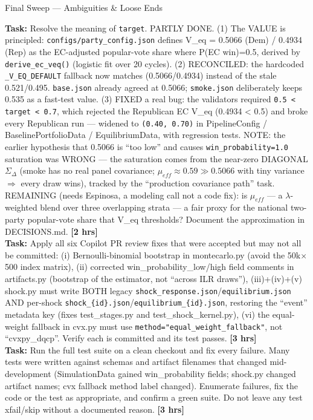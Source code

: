 \documentclass[11pt]{article}
\newcommand{\hrs}[1]{\textbf{[#1 hrs]}}
\newcommand{\task}[2]{%
  \noindent\textbf{Task:} #1 \hfill \hrs{#2}\\}
\begin{document}
\begin{taskbox}{Final Sweep --- Ambiguities \& Loose Ends}

\task{Resolve the meaning of \texttt{target}. PARTLY DONE. (1) The VALUE is
  principled: \texttt{configs/party\_config.json} defines V\_eq = 0.5066 (Dem) /
  0.4934 (Rep) as the EC-adjusted popular-vote share where P(EC win)=0.5, derived
  by \texttt{derive\_ec\_veq()} (logistic fit over 20 cycles). (2) RECONCILED: the
  hardcoded \texttt{\_V\_EQ\_DEFAULT} fallback now matches (0.5066/0.4934) instead
  of the stale 0.521/0.495. \texttt{base.json} already agreed at 0.5066;
  \texttt{smoke.json} deliberately keeps 0.535 as a fast-test value. (3) FIXED a
  real bug: the validators required \texttt{0.5 < target < 0.7}, which rejected the
  Republican EC V\_eq (0.4934 < 0.5) and broke every Republican run --- widened to
  \texttt{(0.40, 0.70)} in PipelineConfig / BaselinePortfolioData / EquilibriumData,
  with regression tests. NOTE: the earlier hypothesis that 0.5066 is ``too low''
  and causes \texttt{win\_probability=1.0} saturation was WRONG --- the saturation
  comes from the near-zero DIAGONAL $\Sigma_\Delta$ (smoke has no real panel
  covariance; $\mu_{eff}\approx0.59 \gg 0.5066$ with tiny variance $\Rightarrow$
  every draw wins), tracked by the ``production covariance path'' task.
  REMAINING (needs Espinosa, a modeling call not a code fix): is $\mu_{eff}$ --- a
  $\lambda$-weighted blend over three overlapping strata --- a fair proxy for the
  national two-party popular-vote share that V\_eq thresholds? Document the
  approximation in DECISIONS.md.}{2}

\task{Apply all six Copilot PR review fixes that were accepted but may not
  all be committed: (i) Bernoulli-binomial bootstrap in montecarlo.py
  (avoid the 50k$\times$500 index matrix), (ii) corrected
  win\_probability\_low/high field comments in artifacts.py (bootstrap of
  the estimator, not ``across ILR draws''), (iii)+(iv)+(v) shock.py must
  write BOTH legacy \texttt{shock\_response.json}/\texttt{equilibrium.json}
  AND per-shock \texttt{shock\_\{id\}.json}/\texttt{equilibrium\_\{id\}.json},
  restoring the ``event'' metadata key (fixes test\_stages.py and
  test\_shock\_kernel.py), (vi) the equal-weight fallback in cvx.py must
  use \texttt{method="equal\_weight\_fallback"}, not ``cvxpy\_dqcp''. Verify
  each is committed and its test passes.}{3}

\task{Run the full test suite on a clean checkout and fix every failure.
  Many tests were written against schemas and artifact filenames that
  changed mid-development (SimulationData gained win\_probability fields;
  shock.py changed artifact names; cvx fallback method label changed).
  Enumerate failures, fix the code or the test as appropriate, and
  confirm a green suite. Do not leave any test xfail/skip without a
  documented reason.}{3}


\end{taskbox}
\end{document}
